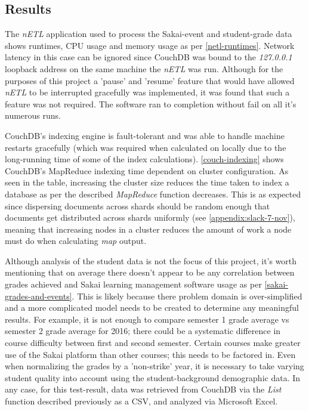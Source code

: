 \subsection{Results}
The \textit{nETL} application used to process the Sakai-event and student-grade data shows runtimes, CPU usage and memory usage as per \ref{netl-runtimes}. Network latency in this case can be ignored since CouchDB was bound to the \textit{127.0.0.1} loopback address on the same machine the \textit{nETL} was run. Although for the purposes of this project a 'pause' and 'resume' feature that would have allowed \textit{nETL} to be interrupted gracefully was implemented, it was found that such a feature was not required. The software ran to completion without fail on all it's numerous runs.

CouchDB's indexing engine is fault-tolerant and was able to handle machine restarts gracefully (which was required when calculated on locally due to the long-running time of some of the index calculations). \ref{couch-indexing} shows CouchDB's MapReduce indexing time dependent on cluster configuration. As seen in the table, increasing the cluster size reduces the time taken to index a database as per the described \textit{MapReduce} function decreases. This is as expected since dispersing documents across shards should be random enough that documents get distributed across shards uniformly (see \ref{appendix:slack-7-nov}), meaning that increasing nodes in a cluster reduces the amount of work a node must do when calculating \textit{map} output.

Although analysis of the student data is not the focus of this project, it's worth mentioning that on average there doesn't appear to be any correlation between grades achieved and Sakai learning management software usage as per \ref{sakai-grades-and-events}. This is likely because there problem domain is over-simplified and a more complicated model needs to be created to determine any meaningful results. For example, it is not enough to compare semester 1 grade average vs semester 2 grade average for 2016; there could be a systematic difference in course difficulty between first and second semester. Certain courses make greater use of the Sakai platform than other courses; this needs to be factored in. Even when normalizing the grades by a 'non-strike' year, it is necessary to take varying student quality into account using the student-background demographic data. In any case, for this test-result, data was retrieved from CouchDB via the \textit{List} function described previously as a CSV, and analyzed via Microsoft Excel.

